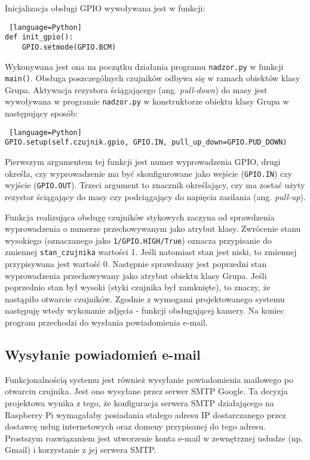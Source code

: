 \documentclass[a4paper,12pt,twoside]{article}
\begin{document}
Inicjalizacja obsługi GPIO wywoływana jest w funkcji:  
\begin{lstlisting} [language=Python]
def init_gpio():
    GPIO.setmode(GPIO.BCM)
\end{lstlisting}
Wykonywana jest ona na początku działania programu \texttt{nadzor.py} w funkcji \texttt{main()}. Obsługa poszczególnych czujników odbywa się w ramach obiektów klasy Grupa. Aktywacja rezystora ściągającego (ang. \textit{pull-down}) do masy jest wywoływana w programie \texttt{nadzor.py} w konstruktorze obiektu klasy Grupa w następujący sposób:
\begin{lstlisting} [language=Python]
GPIO.setup(self.czujnik.gpio, GPIO.IN, pull_up_down=GPIO.PUD_DOWN)
\end{lstlisting}
Pierwszym argumentem tej funkcji jest numer wyprowadzenia GPIO, drugi określa, czy wyprowadzenie ma być skonfigurowane jako wejście (\texttt{GPIO.IN}) czy wyjście (\texttt{GPIO.OUT}). Trzeci argument to znacznik określający, czy ma zostać użyty rezystor ściągający do masy czy podciągający do napięcia zasilania (ang. \textit{pull-up}).

Funkcja realizująca obsługę czujników stykowych zaczyna od sprawdzenia wyprowadzenia o numerze przechowywanym jako atrybut klasy. Zwrócenie stanu wysokiego (oznaczanego jako \texttt{1/GPIO.HIGH/True}) oznacza przypisanie do zmiennej \texttt{stan{\_}czujnika} wartości 1. Jeśli natomiast stan jest niski, to zmiennej przypisywana jest wartość 0. Następnie sprawdzany jest poprzedni stan wyprowadzenia przechowywany jako atrybut obiektu klasy Grupa. Jeśli poprzednio stan był wysoki (styki czujnika był zamknięte), to znaczy, że nastąpiło otwarcie czujników. Zgodnie z wymogami projektowanego systemu następuję wtedy wykonanie zdjęcia - funkcji obsługującej kamery. Na koniec program przechodzi do wysłania powiadomienia e-mail.

\subsection{Wysyłanie powiadomień e-mail}
Funkcjonalnością systemu jest również wysyłanie powiadomienia mailowego po otwarciu czujnika. Jest ono wysyłane przez serwer SMTP Google. Ta decyzja projektowa wynika z tego, że konfiguracja serwera SMTP działającego na Raspberry Pi wymagałaby posiadania stałego adresu IP dostarczanego przez dostawcę usług internetowych oraz domeny przypisanej do tego adresu. Prostszym rozwiązaniem jest utworzenie konta e-mail w zewnętrznej usłudze (np. Gmail) i korzystanie z jej serwera SMTP. 
\end{document}
